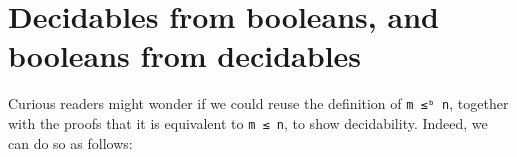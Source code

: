 \begin{fence}
\begin{code}%
\>[0]\<%
\end{code}
\end{fence}

\hypertarget{decidables-from-booleans-and-booleans-from-decidables}{%
\section{Decidables from booleans, and booleans from
decidables}\label{decidables-from-booleans-and-booleans-from-decidables}}

Curious readers might wonder if we could reuse the definition of
\texttt{m\ ≤ᵇ\ n}, together with the proofs that it is equivalent to
\texttt{m\ ≤\ n}, to show decidability. Indeed, we can do so as follows:

\begin{fence}
\begin{code}%
\>[0]\AgdaSpace{}%
\AgdaSymbol{:}\AgdaSpace{}%
\AgdaSpace{}%
\AgdaSymbol{(}\AgdaSpace{}%
\AgdaSpace{}%
\AgdaSymbol{:}\AgdaSpace{}%
\AgdaSymbol{)}\AgdaSpace{}%
\AgdaSpace{}%
\AgdaSpace{}%
\AgdaSymbol{(}\AgdaSpace{}%
\AgdaSpace{}%
\AgdaSymbol{)}\<%
\\
\>[0]\AgdaSpace{}%
\AgdaSpace{}%
\AgdaSpace{}%
\AgdaSpace{}%
\AgdaSpace{}%
\AgdaSpace{}%
\AgdaSpace{}%
\AgdaSymbol{|}\AgdaSpace{}%
\AgdaSpace{}%
\AgdaSpace{}%
\AgdaSpace{}%
\AgdaSymbol{|}\AgdaSpace{}%
\AgdaSpace{}%
\AgdaSymbol{\{}\AgdaSymbol{\}}\AgdaSpace{}%
\AgdaSymbol{\{}\AgdaSymbol{\}}\<%
\\
\>[0]%
\>[11]\AgdaSymbol{|}\AgdaSpace{}%
%
\>[20]\AgdaSymbol{|}\AgdaSpace{}%
%
\>[31]\AgdaSymbol{|}\AgdaSpace{}%
\AgdaSymbol{\AgdaUnderscore{}}%
\>[46]\AgdaSymbol{=}\AgdaSpace{}%
\AgdaSpace{}%
\AgdaSymbol{(}\AgdaSpace{}%
\AgdaSymbol{)}\<%
\\
\>[0]%
\>[11]\AgdaSymbol{|}\AgdaSpace{}%
%
\>[20]\AgdaSymbol{|}\AgdaSpace{}%
\AgdaSymbol{\AgdaUnderscore{}}%
\>[31]\AgdaSymbol{|}\AgdaSpace{}%
%
\>[46]\AgdaSymbol{=}\AgdaSpace{}%
\AgdaSpace{}%
\<%
\end{code}
\end{fence}

